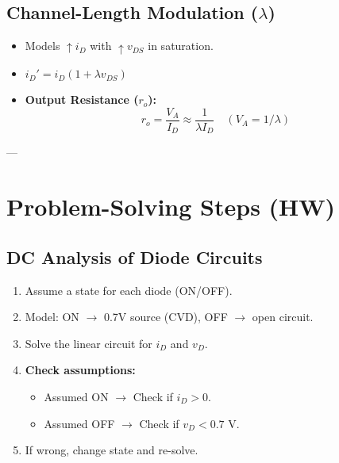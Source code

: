 \documentclass[10pt]{article}
\begin{document}
\begin{multicols*}{2}
\subsection*{Channel-Length Modulation ($\lambda$)}
\begin{itemize}\itemsep0pt
    \item Models $\uparrow i_D$ with $\uparrow v_{DS}$ in saturation.
    \item $i_D' = i_D (1 + \lambda v_{DS})$
    \item \textbf{Output Resistance ($r_o$):}
    \[ r_o = \frac{V_A}{I_D} \approx \frac{1}{\lambda I_D} \quad (V_A = 1/\lambda) \]
\end{itemize}

--- %

\section{Problem-Solving Steps (HW)}

\subsection*{DC Analysis of Diode Circuits}
\begin{enumerate}\itemsep0pt
    \item Assume a state for each diode (ON/OFF).
    \item Model: ON $\rightarrow$ 0.7V source (CVD), OFF $\rightarrow$ open circuit.
    \item Solve the linear circuit for $i_D$ and $v_D$.
    \item \textbf{Check assumptions:}
    \begin{itemize}\itemsep0pt
        \item Assumed ON $\rightarrow$ Check if $i_D > 0$.
        \item Assumed OFF $\rightarrow$ Check if $v_D < 0.7 \text{ V}$.
    \end{itemize}
    \item If wrong, change state and re-solve.
\end{enumerate}


\end{multicols*}
\end{document}
